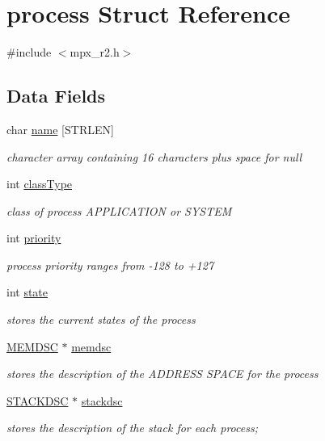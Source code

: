 \hypertarget{structprocess}{
\section{process Struct Reference}
\label{structprocess}
}


{\ttfamily \#include $<$mpx\_\-r2.h$>$}

\subsection*{Data Fields}
\begin{DoxyCompactItemize}
\item 
char \hyperlink{structprocess_ab6613e7bde642a754f71b9f60053cd1a}{name} \mbox{[}STRLEN\mbox{]}
\begin{DoxyCompactList}\small\item\em character array containing 16 characters plus space for null \item\end{DoxyCompactList}\item 
int \hyperlink{structprocess_ac83f8c634a3b58ea5364e9f90ee3bcc2}{classType}
\begin{DoxyCompactList}\small\item\em class of process APPLICATION or SYSTEM \item\end{DoxyCompactList}\item 
int \hyperlink{structprocess_a0d71749eff1f19063bfad58c4bf7ba64}{priority}
\begin{DoxyCompactList}\small\item\em process priority ranges from -\/128 to +127 \item\end{DoxyCompactList}\item 
int \hyperlink{structprocess_a65d9093ba530e1d4e0a67f94d8a60345}{state}
\begin{DoxyCompactList}\small\item\em stores the current states of the process \item\end{DoxyCompactList}\item 
\hyperlink{structmem}{MEMDSC} $\ast$ \hyperlink{structprocess_a163551ab7b60184b48e5d440fcd5c2b8}{memdsc}
\begin{DoxyCompactList}\small\item\em stores the description of the ADDRESS SPACE for the process \item\end{DoxyCompactList}\item 
\hyperlink{structstack}{STACKDSC} $\ast$ \hyperlink{structprocess_a7e0fb37fbb9c155b18f75a94a8fc202b}{stackdsc}
\begin{DoxyCompactList}\small\item\em stores the description of the stack for each process; \item\end{DoxyCompactList}\end{DoxyCompactItemize}



